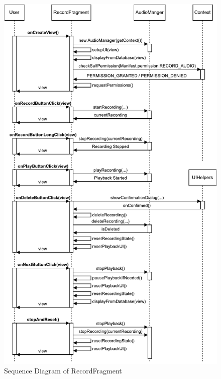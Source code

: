 \documentclass[conference,10pt,letterpaper]{IEEEtran}
\begin{document}
\begin{itemize}
		\begin{figure}[htbp]
			\centerline{\includegraphics[width=\columnwidth]{src/record-sequence.pdf}}
			\caption{Sequence Diagram of RecordFragment}
			\label{fig:record_sequence}
		\end{figure}
		

\end{itemize}
\end{document}
